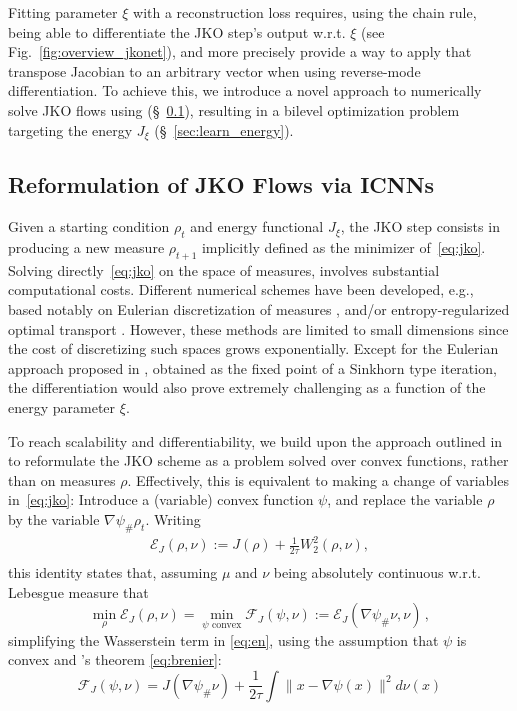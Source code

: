 Fitting parameter $\xi$ with a reconstruction loss requires, using the chain rule, being able to differentiate the \acrshort{JKO} step's output w.r.t. $\xi$ (see Fig.~\ref{fig:overview_jkonet}), and more precisely provide a way to apply that transpose Jacobian to an arbitrary vector when using reverse-mode differentiation. To achieve this, we introduce a novel approach to numerically solve \acrshort{JKO} flows using  (\S~\ref{sec:jko_icnn}), resulting in a bilevel optimization problem targeting the energy $J_\xi$ (\S~\ref{sec:learn_energy}).

\subsection{Reformulation of JKO Flows via ICNNs} \label{sec:jko_icnn}
Given a starting condition $\rho_t$ and energy functional $J_\xi$, the \acrshort{JKO} step consists in producing a new measure $\rho_{t+1}$ implicitly defined as the minimizer of~\eqref{eq:jko}. Solving directly~\eqref{eq:jko} on the space of measures, involves substantial computational costs. Different numerical schemes have been developed, e.g., based notably on Eulerian discretization of measures \citep{carrillo2021primal, benamou2016discretization}, and/or entropy-regularized optimal transport \citep{peyre2015entropic}. However, these methods are limited to small dimensions since the cost of discretizing such spaces grows exponentially. Except for the Eulerian approach proposed in \citep{peyre2015entropic}, obtained as the fixed point of a Sinkhorn type iteration, the differentiation would also prove extremely challenging as a function of the energy parameter $\xi$.

 To reach scalability and differentiability, we build upon the approach outlined in \citet{benamou2016discretization} to reformulate the \acrshort{JKO} scheme as a problem solved over convex functions, rather than on measures $\rho$. Effectively, this is equivalent to making a change of variables in~\eqref{eq:jko}: Introduce a (variable) convex function $\psi$, and replace the variable $\rho$ by the variable $\nabla \psi_{\#}\rho_t$. Writing
\begin{equation}\label{eq:en}
\begin{split}
\mathcal{E}_J(\rho, \nu) := J(\rho) +\frac{1}{2 \tau}W_2^2(\rho, \nu),\\
\end{split}
\end{equation}
this identity states that, assuming $\mu$ and $\nu$ being absolutely continuous w.r.t. Lebesgue measure that
$$\min_{\rho}\mathcal{E}_J(\rho,\nu) = \min_{\psi \text{ convex}} \mathcal{F}_J(\psi, \nu):= \mathcal{E}_J(\nabla \psi_{\#}\nu, \nu)\,,$$
simplifying the Wasserstein term in \eqref{eq:en}, using the assumption that $\psi$ is convex and \citeauthor{brenier1987decomposition}'s theorem \eqref{eq:brenier}:
\begin{equation}\mathcal{F}_J(\psi, \nu) = J(\nabla \psi_{\#}\nu) +\frac{1}{2 \tau} \!\! \int\!\! \| x - \nabla \psi(x) \|^2 d \nu(x)\label{eq:jko_psi}
\end{equation}

